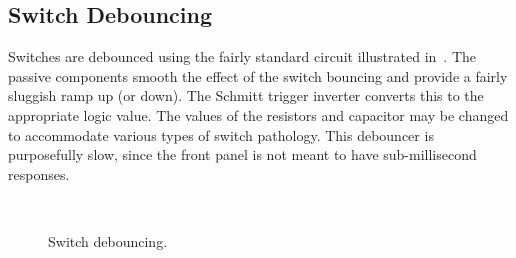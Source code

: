 \subsection{Switch Debouncing}

Switches are debounced using the fairly standard circuit illustrated
in~. The passive components smooth the effect of the
switch bouncing and provide a fairly sluggish ramp up (or down). The Schmitt
trigger inverter converts this to the appropriate logic value. The values of
the resistors and capacitor may be changed to accommodate various types of
switch pathology. This debouncer is purposefully slow, since the front panel is
not meant to have sub-millisecond responses.

\begin{figure}
\centering
{}\\
\caption{\label{fig-switch-debounce}Switch debouncing.}
\end{figure}

